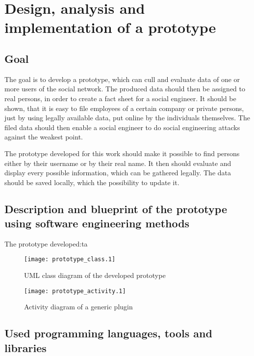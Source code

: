 \chapter{Design, analysis and implementation of a prototype}
\label{chapter:prototype}

\section{Goal}

The goal is to develop a prototype, which can cull and evaluate data of one or
more users of the \Twitter{} social network. The produced data should then be
assigned to real persons, in order to create a fact sheet for a social
engineer. It should be shown, that it is easy to file employees of a certain
company or private persons, just by using legally available data, put online by
the individuals themselves. The filed data should then enable a social
engineer to do social engineering attacks against the weakest point.

The prototype developed for this work should make it possible to find persons
either by their username or by their real name.
It then should evaluate and display every possible information, which can be
gathered legally. The data should be saved locally, which the possibility to
update it.

\section{Description and blueprint of the prototype using software engineering methods}

The prototype developed:ta

\begin{figure}
  \begin{center}
    \texttt{[image: prototype\_class.1]}
    \caption{UML class diagram of the developed prototype}
  \end{center}
\end{figure}


\begin{figure}
  \begin{center}
    \texttt{[image: prototype\_activity.1]}
    \caption{Activity diagram of a generic plugin}
  \end{center}
\end{figure}

\section{Used programming languages, tools and libraries}

